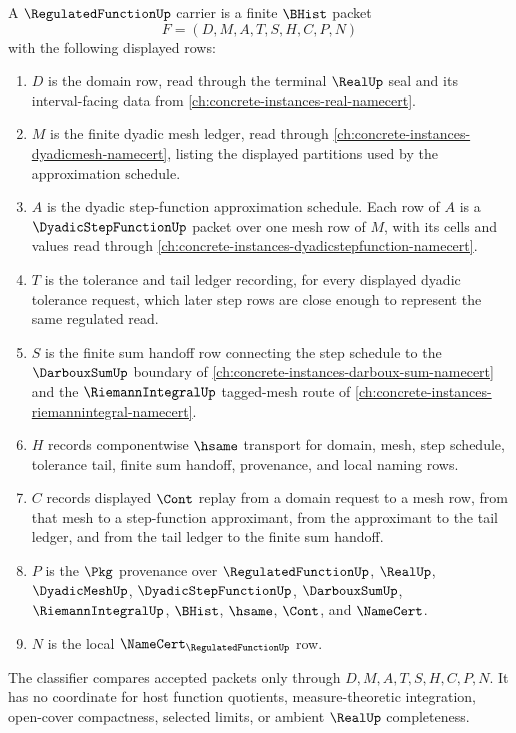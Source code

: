 \begin{definition}
\label{def:regulated-function-carrier}
A $\RegulatedFunctionUp$ carrier is a finite $\BHist$ packet
$$
F=(D,M,A,T,S,H,C,P,N)
$$
with the following displayed rows:
\begin{enumerate}
\item $D$ is the domain row, read through the terminal $\RealUp$ seal and its interval-facing data from \autoref{ch:concrete-instances-real-namecert}.
\item $M$ is the finite dyadic mesh ledger, read through \autoref{ch:concrete-instances-dyadicmesh-namecert}, listing the displayed partitions used by the approximation schedule.
\item $A$ is the dyadic step-function approximation schedule. Each row of $A$ is a $\DyadicStepFunctionUp$ packet over one mesh row of $M$, with its cells and values read through \autoref{ch:concrete-instances-dyadicstepfunction-namecert}.
\item $T$ is the tolerance and tail ledger recording, for every displayed dyadic tolerance request, which later step rows are close enough to represent the same regulated read.
\item $S$ is the finite sum handoff row connecting the step schedule to the $\DarbouxSumUp$ boundary of \autoref{ch:concrete-instances-darboux-sum-namecert} and the $\RiemannIntegralUp$ tagged-mesh route of \autoref{ch:concrete-instances-riemannintegral-namecert}.
\item $H$ records componentwise $\hsame$ transport for domain, mesh, step schedule, tolerance tail, finite sum handoff, provenance, and local naming rows.
\item $C$ records displayed $\Cont$ replay from a domain request to a mesh row, from that mesh to a step-function approximant, from the approximant to the tail ledger, and from the tail ledger to the finite sum handoff.
\item $P$ is the $\Pkg$ provenance over $\RegulatedFunctionUp$, $\RealUp$, $\DyadicMeshUp$, $\DyadicStepFunctionUp$, $\DarbouxSumUp$, $\RiemannIntegralUp$, $\BHist$, $\hsame$, $\Cont$, and $\NameCert$.
\item $N$ is the local $\NameCert_{\RegulatedFunctionUp}$ row.
\end{enumerate}
The classifier compares accepted packets only through $D,M,A,T,S,H,C,P,N$. It has no coordinate for host function quotients, measure-theoretic integration, open-cover compactness, selected limits, or ambient $\RealUp$ completeness.
\end{definition}

